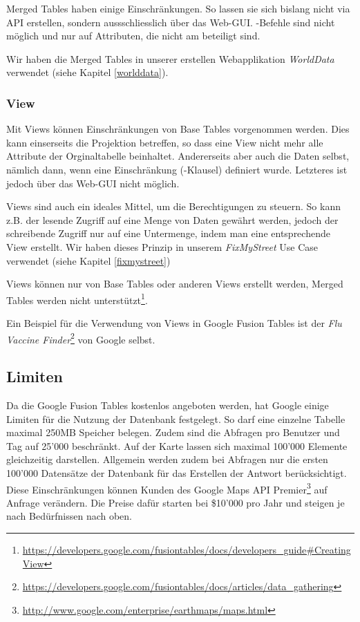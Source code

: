 Merged Tables haben einige Einschränkungen. So lassen sie sich bislang nicht via \gls{API} erstellen, sondern aussschliesslich über das Web-GUI. -Befehle sind nicht möglich und  nur auf Attributen, die nicht am  beteiligt sind.

Wir haben die Merged Tables in unserer erstellen Webapplikation \emph{WorldData} verwendet (siehe Kapitel \ref{worlddata}).

\subsubsection{View}
Mit Views können Einschränkungen von Base Tables vorgenommen werden. Dies kann einserseits die Projektion betreffen, so dass eine View nicht mehr alle Attribute der Orginaltabelle beinhaltet. Andererseits aber auch die Daten selbst, nämlich dann, wenn eine Einschränkung (-Klausel) definiert wurde. Letzteres ist jedoch über das Web-GUI nicht möglich.

Views sind auch ein ideales Mittel, um die Berechtigungen zu steuern. So kann z.B. der lesende Zugriff auf eine Menge von Daten gewährt werden, jedoch der schreibende Zugriff nur auf eine Untermenge, indem man eine entsprechende View erstellt. Wir haben dieses Prinzip in unserem \emph{FixMyStreet} Use Case verwendet (siehe Kapitel \ref{fixmystreet})

Views können nur von Base Tables oder anderen Views erstellt werden, Merged Tables werden nicht unterstützt\footnote{\url{https://developers.google.com/fusiontables/docs/developers_guide\#CreatingView}}.

Ein Beispiel für die Verwendung von Views in Google Fusion Tables ist der \emph{Flu Vaccine Finder}\footnote{\url{https://developers.google.com/fusiontables/docs/articles/data_gathering}} von Google selbst.

\subsection{Limiten}
Da die Google Fusion Tables kostenlos angeboten werden, hat Google einige Limiten für die Nutzung der Datenbank festgelegt. So darf eine einzelne Tabelle maximal 250MB Speicher belegen. Zudem sind die Abfragen pro Benutzer und Tag auf 25'000 beschränkt. Auf der Karte lassen sich maximal 100'000 Elemente gleichzeitig darstellen. Allgemein werden zudem bei Abfragen nur die ersten 100'000 Datensätze der Datenbank für das Erstellen der Antwort berücksichtigt. Diese Einschränkungen können Kunden des Google Maps \gls{API} Premier\footnote{\url{http://www.google.com/enterprise/earthmaps/maps.html}} auf Anfrage verändern. Die Preise dafür starten bei \$10'000 pro Jahr und steigen je nach Bedürfnissen nach oben.\cite{fusion-tables-geo-limits}

